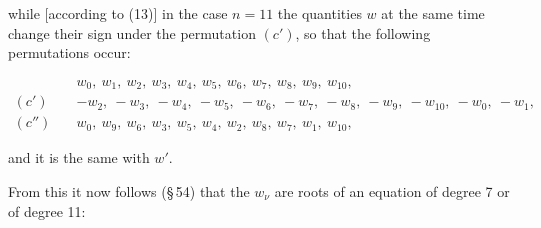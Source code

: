 while [according to (13)] in the case $n = 11$ the quantities $w$ at the same time change their sign under the permutation $(c')$, so that the following permutations occur:

\[
\begin{aligned}
& w_0,\ w_1,\ w_2,\ w_3,\ w_4,\ w_5,\ w_6,\ w_7,\ w_8,\ w_9,\ w_{10},\\
(c') \quad & -w_2,\ -w_3,\ -w_4,\ -w_5,\ -w_6,\ -w_7,\ -w_8,\ -w_9,\ -w_{10},\ -w_0,\ -w_1,\\
(c'') \quad & w_0,\ w_9,\ w_6,\ w_3,\ w_5,\ w_4,\ w_2,\ w_8,\ w_7,\ w_1,\ w_{10},
\end{aligned}
\]

and it is the same with $w'$.

From this it now follows (\S\,54) that the $w_\nu$ are roots of an equation of degree 7 or of degree 11:

